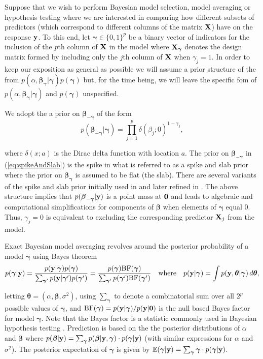 \documentclass[12pt]{article}
\def\vectorfontone{\bf}
\def\vectorfonttwo{\boldsymbol}
\def\vy{{\vectorfontone y}}                      %
\def\vzero{{\vectorfontone 0}}
\def\vbeta{{\vectorfonttwo \beta}}               %
\def\vgamma{{\vectorfonttwo \gamma}}             %
\def\vtheta{{\vectorfonttwo \theta}}             %
\def\matrixfontone{\bf}
\def\mX{{\matrixfontone X}}                      %
\def\bE{{\mathbb E}}                             %
\def\ds{\displaystyle}
\begin{document}
Suppose that we wish to perform Bayesian model selection, model averaging or hypothesis 
testing where we are interested in comparing how different subsets of predictors 
(which correspond to different columns of the matrix $\mX$) have on the response $\vy$. To this end, 
let $\vgamma \in \{0, 1\}^p$ be a binary vector of indicators for the inclusion of the $p$th column 
of $\mX$ in the model where $\mX_\vgamma$ denotes the design matrix formed by including only the 
$j$th column of $\mX$ when $\gamma_j = 1$. 
In order to keep our exposition as general as possible we will assume a prior structure of
the from 
$p(\alpha,\vbeta_{\vgamma}|\vgamma)p(\vgamma)$ but,
for
the time being, we will leave the specific fom of $p(\alpha,\vbeta_{\vgamma}|\vgamma)$ and $p(\vgamma)$ unspecified. 

We adopt the a prior on $\vbeta_{-\vgamma}$  
of the form
\begin{equation}
\label{eq:spikeAndSlab}
\ds p(\vbeta_{-\vgamma}|\vgamma) = \prod_{j=1}^p \delta(\beta_j;0)^{1-\gamma_j},
\end{equation} 

\noindent where $\delta(x;a)$ is the Dirac delta function with location $a$.  
The prior on $\vbeta_{-\vgamma}$ in (\ref{eq:spikeAndSlab}) is the spike 
in what is referred to as a spike and slab prior where the prior on $\vbeta_{\vgamma}$ is assumed to be flat (the slab). There are
several variants of the spike and slab prior initially used in
\cite{Mitchell1988}
and later refined in
\cite{George1993}. 
The above structure implies 
that $p(\vbeta_{-\vgamma}|\vy)$ is a point mass at $\vzero$
and leads to
algebraic and computational simplifications for components of $\vbeta$ when elements of $\vgamma$ equal 0.
Thus, $\gamma_j=0$ is equivalent to excluding the corresponding predictor $\mX_j$ from the model.


Exact Bayesian model averaging revolves around the posterior
 probability of a model $\vgamma$ using Bayes theorem
$$
\ds p(\vgamma|\vy) = \frac{p(\vy|\vgamma)p(\vgamma)}{\sum_{\vgamma'} p(\vy|\vgamma')p(\vgamma')} = \frac{p(\vgamma)\mbox{BF}(\vgamma)}{\sum_{\vgamma'} p(\vgamma')\mbox{BF}(\vgamma')}
\quad \mbox{where} \quad 
p(\vy|\vgamma) = \int p(\vy,\vtheta|\vgamma) \, d\vtheta,
$$

\noindent letting $\vtheta = (\alpha,\vbeta,\sigma^2)$, using $\sum_{\vgamma}$ to denote a combinatorial sum over all
$2^p$ possible values of $\vgamma$, and $\mbox{BF}(\vgamma) = p(\vy|\vgamma)/p(\vy|\vzero)$
is the null based Bayes factor for model $\vgamma$.
Note that the Bayes factor is a statistic commonly used in Bayesian hypothesis testing 
\citep{Kass1995,OrmerodEtal2017}.
Prediction is based on the 
the posterior distributions of $\alpha$ and $\vbeta$ where
$p(\vbeta|\vy) = \sum_{\vgamma} p(\vbeta|\vy,\vgamma) \cdot p(\vgamma|\vy)$
(with similar expressions for $\alpha$ and $\sigma^2$).
The 
posterior expectation of $\vgamma$ is given by
$\bE(\vgamma|\vy) = \sum_{\vgamma} \vgamma \cdot p(\vgamma|\vy)$.
\end{document}
